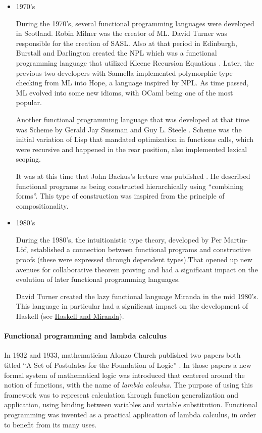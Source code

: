 \documentclass[a4paper, titlepage, twoside]{article}
\begin{document}
\begin{itemize}
\item 1970's

During the 1970's, several functional programming languages were developed in Scotland. Robin Milner was the creator of ML. David Turner was responsible for the creation of SASL. Also at that period in Edinburgh, Burstall and Darlington created the NPL which was a functional programming language that utilized Kleene Recursion Equations \autocite{darlingtonProgramTransformationSynthesis1977}. Later, the previous two developers with Sannella implemented polymorphic type checking from ML into Hope, a language inspired by NPL. As time passed, ML evolved into some new idioms, with OCaml being one of the most popular.

Another functional programming language that was developed at that time was Scheme by Gerald Jay Sussman and Guy L. Steele \autocite{abelsonRevisedReportAlgorithmic1998}. Scheme was the initial variation of Lisp that mandated optimization in functions calls, which were recursive and happened in the rear position, also implemented lexical scoping.

It was at this time that John Backus's lecture was published \autocite{backusCanProgrammingBe1978}. He described functional programs as being constructed hierarchically using ``combining forms''. This type of construction was inspired from the principle of compositionality.

\item 1980's

During the 1980's, the intuitionistic type theory, developed by Per Martin-Löf, established a connection between functional programs and constructive proofs (these were expressed through dependent types).That opened up new avenues for collaborative theorem proving and had a significant impact on the evolution of later functional programming languages.

David Turner created the lazy functional language Miranda \autocite{turnerMirandaNonstrictFunctional1985} in the mid 1980's. This language in particular had a significant impact on the development of Haskell (see \hyperref[sec:org51bbaa0]{Haskell and Miranda}).
\end{itemize}

\paragraph*{Functional programming and lambda calculus}
\label{sec:org30410ed}

In 1932 and 1933, mathematician Alonzo Church published two papers both titled ``A Set of Postulates for the Foundation of Logic'' \autocite{churchSetPostulatesFoundation1932,churchSetPostulatesFoundation1933}. In those papers a new formal system of mathematical logic was introduced that centered around the notion of functions, with the name of \emph{lambda calculus}. The purpose of using this framework was to represent calculation through function generalization and application, using binding between variables and variable substitution. Functional programming was invented as a practical application of lambda calculus, in order to benefit from its many uses.
\end{document}
